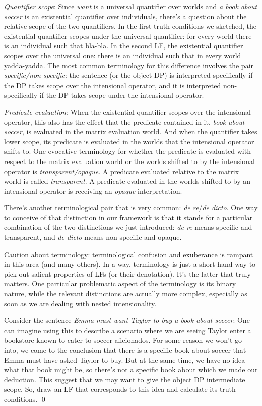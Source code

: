\emph{Quantifier scope}: Since \emph{want} is a universal quantifier over worlds
and \emph{a book about soccer} is an existential quantifier over individuals,
there's a question about the relative scope of the two quantifiers. In the first
truth-conditions we sketched, the existential quantifier scopes under the
universal quantifier: for every world there is an individual such that bla-bla.
In the second LF, the existential quantifier scopes over the universal one:
there is an individual such that in every world yadda-yadda. The most common
terminology for this difference involves the pair \emph{specific/non-specific}:
the sentence (or the object DP) is interpreted specifically if the DP takes
scope over the intensional operator, and it is interpreted non-specifically if
the DP takes scope under the intensional operator.

\emph{Predicate evaluation}: When the existential quantifier scopes over the
intensional operator, this also has the effect that the predicate contained in
it, \emph{book about soccer}, is evaluated in the matrix evaluation world. And
when the quantifier takes lower scope, its predicate is evaluated in the worlds
that the intensional operator shifts to. One evocative terminology for whether
the predicate is evaluated with respect to the matrix evaluation world or the
worlds shifted to by the intensional operator is \emph{transparent/opaque}. A
predicate evaluated relative to the matrix world is called \emph{transparent}. A
predicate evaluated in the worlds shifted to by an intensional operator is
receiving an \emph{opaque} interpretation.

There's another terminological pair that is very common: \emph{de re}/\emph{de
  dicto}. One way to conceive of that distinction in our framework is that it
stands for a particular combination of the two distinctions we just introduced:
\emph{de re} means specific and transparent, and \emph{de dicto} means
non-specific and opaque.

Caution about terminology: terminological confusion and exuberance is rampant in
this area (and many others). In a way, terminology is just a short-hand way to
pick out salient properties of LFs (or their denotation). It's the latter that
truly matters. One particular problematic aspect of the terminology is its
binary nature, while the relevant distinctions are actually more complex,
especially as soon as we are dealing with nested intensionality.

\begin{exercise}
  Consider the sentence \emph{Emma must want Taylor to buy a book about soccer}.
  One can imagine using this to describe a scenario where we are seeing Taylor
  enter a bookstore known to cater to soccer aficionados. For some reason we
  won't go into, we come to the conclusion that there is a specific book about
  soccer that Emma must have asked Taylor to buy. But at the same time, we have
  no idea what that book might be, so there's not a specific book about which we
  made our deduction. This suggest that we may want to give the object DP
  intermediate scope. So, draw an LF that corresponds to this idea and calculate
  its truth-conditions. \qed
\end{exercise}


